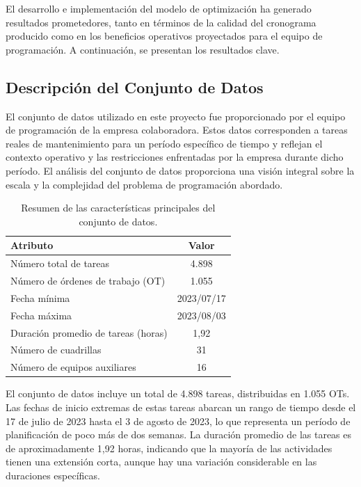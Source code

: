 \documentclass{article}
\begin{document}
El desarrollo e implementación del modelo de optimización ha generado resultados prometedores, tanto en términos de la calidad del cronograma producido como en los beneficios operativos proyectados para el equipo de programación. A continuación, se presentan los resultados clave.


\subsection{Descripción del Conjunto de Datos}

El conjunto de datos utilizado en este proyecto fue proporcionado por el equipo de programación de la empresa colaboradora. Estos datos corresponden a tareas reales de mantenimiento para un período específico de tiempo y reflejan el contexto operativo y las restricciones enfrentadas por la empresa durante dicho período. El análisis del conjunto de datos proporciona una visión integral sobre la escala y la complejidad del problema de programación abordado.

\begin{table}[htbp]
    \centering
    \begin{tabular}{lc}
        \toprule
        \textbf{Atributo} & \textbf{Valor} \\
        \midrule
        Número total de tareas & 4.898 \\
        Número de órdenes de trabajo (OT) & 1.055 \\
        Fecha mínima & 2023/07/17 \\
        Fecha máxima & 2023/08/03 \\
        Duración promedio de tareas (horas) & 1,92 \\
        Número de cuadrillas & 31 \\
        Número de equipos auxiliares & 16 \\
        \bottomrule
    \end{tabular}
    \caption{Resumen de las características principales del conjunto de datos.}
    \label{tab:dataset_summary}
\end{table}


El conjunto de datos incluye un total de 4.898 tareas, distribuidas en 1.055 OTs. Las fechas de inicio extremas de estas tareas abarcan un rango de tiempo desde el 17 de julio de 2023 hasta el 3 de agosto de 2023, lo que representa un período de planificación de poco más de dos semanas. La duración promedio de las tareas es de aproximadamente 1,92 horas, indicando que la mayoría de las actividades tienen una extensión corta, aunque hay una variación considerable en las duraciones específicas.
\end{document}
